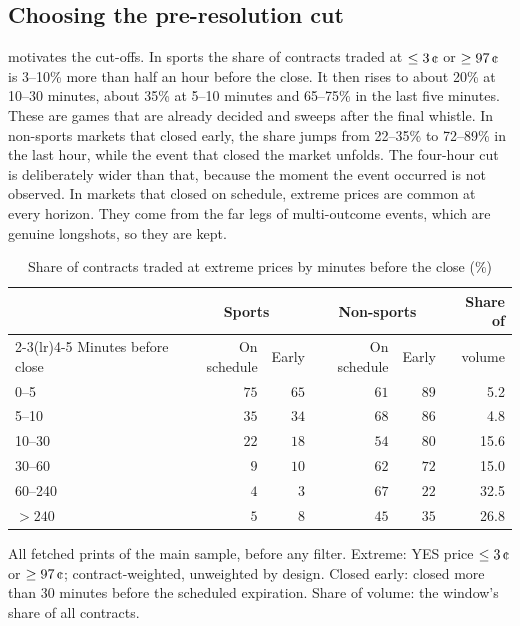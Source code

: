 \subsection{Choosing the pre-resolution cut}\label{app:flow-preres}

 motivates the cut-offs. In sports the share of contracts traded at
$\le3\cents$ or $\ge97\cents$ is 3--10\% more than half an hour before the close. It then rises
to about 20\% at 10--30 minutes, about 35\% at 5--10 minutes and 65--75\% in the last five
minutes. These are games that are already decided and sweeps after the final whistle. In
non-sports markets that closed early, the share jumps from 22--35\% to 72--89\% in the last hour,
while the event that closed the market unfolds. The four-hour cut is deliberately wider than
that, because the moment the event occurred is not observed. In markets that closed on schedule,
extreme prices are common at every horizon. They come from the far legs of multi-outcome events,
which are genuine longshots, so they are kept.

\begin{table}[htbp]
\centering
\begin{threeparttable}
\caption{Share of contracts traded at extreme prices by minutes before the close (\%)}\label{tab:flow-preres}
\footnotesize
\begin{tabular}{@{}lrrrrr@{}}
\toprule
 & \multicolumn{2}{c}{Sports} & \multicolumn{2}{c}{Non-sports} & Share of \\
\cmidrule(lr){2-3}\cmidrule(lr){4-5}
Minutes before close & On schedule & Early & On schedule & Early & volume \\
\midrule
0--5 & $75$ & $65$ & $61$ & $89$ & 5.2 \\
5--10 & $35$ & $34$ & $68$ & $86$ & 4.8 \\
10--30 & $22$ & $18$ & $54$ & $80$ & 15.6 \\
30--60 & $9$ & $10$ & $62$ & $72$ & 15.0 \\
60--240 & $4$ & $3$ & $67$ & $22$ & 32.5 \\
$>240$ & $5$ & $8$ & $45$ & $35$ & 26.8 \\
\bottomrule
\end{tabular}
\begin{tablenotes}\footnotesize
\item All fetched prints of the main sample, before any filter. Extreme: YES price $\le3\cents$
or $\ge97\cents$; contract-weighted, unweighted by design. Closed early: closed more than 30
minutes before the scheduled expiration. Share of volume: the window's share of all contracts.
\end{tablenotes}
\end{threeparttable}
\end{table}

